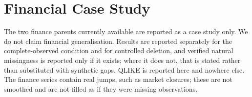 \documentclass{article}
\begin{document}
\begin{table}[h]
  \caption{Governance contract by input regime. The complete-input rows are contract
  statements, not accuracy results: the expected behaviour is a no-op, and a non-no-op
  there would be a defect rather than an improvement.}
  \label{tab:app-complete}
  \centering
  \small
  \setlength{\tabcolsep}{4pt}
\end{table}

\section{Financial Case Study}
\label{app:finance}
The two finance parents currently available are reported as a case study only. We do not
claim financial generalisation. Results are reported separately for the complete-observed
condition and for controlled deletion, and verified natural missingness is reported only
if it exists; where it does not, that is stated rather than substituted with synthetic
gaps. QLIKE is reported here and nowhere else. The finance series contain real jumps, such
as market closures; these are not smoothed and are not filled as if they were missing
observations.
\end{document}
